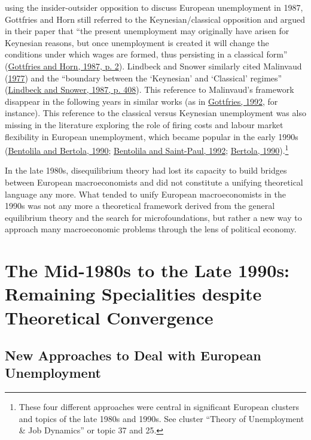 \documentclass[
  12pt,
  onecolumn]{article}
\begin{document}
using the insider-outsider opposition to discuss European unemployment
in 1987, Gottfries and Horn still referred to the Keynesian/classical
opposition and argued in their paper that ``the present unemployment may
originally have arisen for Keynesian reasons, but once unemployment is
created it will change the conditions under which wages are formed, thus
persisting in a classical form''
(\protect\hyperlink{ref-gottfries1987}{Gottfries and Horn, 1987, p. 2}).
Lindbeck and Snower similarly cited Malinvaud
(\protect\hyperlink{ref-malinvaud1977}{1977}) and the ``boundary between
the `Keynesian' and `Classical' regimes''
(\protect\hyperlink{ref-lindbeck1987a}{Lindbeck and Snower, 1987, p.
408}). This reference to Malinvaud's framework disappear in the
following years in similar works (as in
\protect\hyperlink{ref-gottfries1992}{Gottfries, 1992}, for instance).
This reference to the classical versus Keynesian unemployment was also
missing in the literature exploring the role of firing costs and labour
market flexibility in European unemployment, which became popular in the
early 1990s (\protect\hyperlink{ref-bentolila1990}{Bentolila and
Bertola, 1990}; \protect\hyperlink{ref-bentolila1992a}{Bentolila and
Saint-Paul, 1992}; \protect\hyperlink{ref-bertola1990a}{Bertola,
1990}).\footnote{These four different approaches were central in
  significant European clusters and topics of the late 1980s and 1990s.
  See cluster ``Theory of Unemployment \& Job Dynamics'' or topic 37 and
  25.}

In the late 1980s, disequilibrium theory had lost its capacity to build
bridges between European macroeconomists and did not constitute a
unifying theoretical language any more. What tended to unify European
macroeconomists in the 1990s was not any more a theoretical framework
derived from the general equilibrium theory and the search for
microfoundations, but rather a new way to approach many macroeconomic
problems through the lens of political economy.

\hypertarget{the-mid-1980s-to-the-late-1990s-remaining-specialities-despite-theoretical-convergence}{%
\section{The Mid-1980s to the Late 1990s: Remaining Specialities despite
Theoretical
Convergence}\label{the-mid-1980s-to-the-late-1990s-remaining-specialities-despite-theoretical-convergence}}

\hypertarget{new-approaches-to-deal-with-european-unemployment}{%
\subsection{New Approaches to Deal with European
Unemployment}\label{new-approaches-to-deal-with-european-unemployment}}
\end{document}
